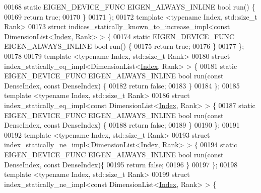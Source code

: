 \begin{DoxyCode}
00168   \textcolor{keyword}{static} EIGEN\_DEVICE\_FUNC EIGEN\_ALWAYS\_INLINE \textcolor{keywordtype}{bool} run() \{
00169     \textcolor{keywordflow}{return} \textcolor{keyword}{true};
00170   \}
00171 \};
00172 \textcolor{keyword}{template} <\textcolor{keyword}{typename} Index, std::\textcolor{keywordtype}{size\_t} Rank>
00173 \textcolor{keyword}{struct }indices\_statically\_known\_to\_increase\_impl<const DimensionList<\hyperlink{namespace_eigen_a62e77e0933482dafde8fe197d9a2cfde}{Index}, Rank> > \{
00174   \textcolor{keyword}{static} EIGEN\_DEVICE\_FUNC EIGEN\_ALWAYS\_INLINE \textcolor{keywordtype}{bool} run() \{
00175     \textcolor{keywordflow}{return} \textcolor{keyword}{true};
00176   \}
00177 \};
00178 
00179 \textcolor{keyword}{template} <\textcolor{keyword}{typename} Index, std::\textcolor{keywordtype}{size\_t} Rank>
00180 \textcolor{keyword}{struct }index\_statically\_eq\_impl<DimensionList<\hyperlink{namespace_eigen_a62e77e0933482dafde8fe197d9a2cfde}{Index}, Rank> > \{
00181   \textcolor{keyword}{static} EIGEN\_DEVICE\_FUNC EIGEN\_ALWAYS\_INLINE \textcolor{keywordtype}{bool} run(\textcolor{keyword}{const} DenseIndex, \textcolor{keyword}{const} DenseIndex) \{
00182     \textcolor{keywordflow}{return} \textcolor{keyword}{false};
00183   \}
00184 \};
00185 \textcolor{keyword}{template} <\textcolor{keyword}{typename} Index, std::\textcolor{keywordtype}{size\_t} Rank>
00186 \textcolor{keyword}{struct }index\_statically\_eq\_impl<const DimensionList<\hyperlink{namespace_eigen_a62e77e0933482dafde8fe197d9a2cfde}{Index}, Rank> > \{
00187   \textcolor{keyword}{static} EIGEN\_DEVICE\_FUNC EIGEN\_ALWAYS\_INLINE \textcolor{keywordtype}{bool} run(\textcolor{keyword}{const} DenseIndex, \textcolor{keyword}{const} DenseIndex) \{
00188     \textcolor{keywordflow}{return} \textcolor{keyword}{false};
00189   \}
00190 \};
00191 
00192 \textcolor{keyword}{template} <\textcolor{keyword}{typename} Index, std::\textcolor{keywordtype}{size\_t} Rank>
00193 \textcolor{keyword}{struct }index\_statically\_ne\_impl<DimensionList<\hyperlink{namespace_eigen_a62e77e0933482dafde8fe197d9a2cfde}{Index}, Rank> > \{
00194   \textcolor{keyword}{static} EIGEN\_DEVICE\_FUNC EIGEN\_ALWAYS\_INLINE \textcolor{keywordtype}{bool} run(\textcolor{keyword}{const} DenseIndex, \textcolor{keyword}{const} DenseIndex)\{
00195     \textcolor{keywordflow}{return} \textcolor{keyword}{false};
00196   \}
00197 \};
00198 \textcolor{keyword}{template} <\textcolor{keyword}{typename} Index, std::\textcolor{keywordtype}{size\_t} Rank>
00199 \textcolor{keyword}{struct }index\_statically\_ne\_impl<const DimensionList<\hyperlink{namespace_eigen_a62e77e0933482dafde8fe197d9a2cfde}{Index}, Rank> > \{

\end{DoxyCode}
